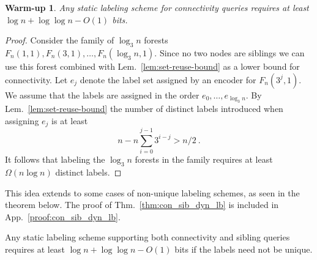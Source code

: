 \documentclass{llncs}
\newtheorem*{warmup}{Warm-up}
\begin{document}
\begin{warmup}
    Any static labeling scheme for connectivity queries requires at least $\log
    n + \log\log n - O(1)$ bits.
\end{warmup}
\begin{proof}
    Consider the family of $\log_3 n$ forests $F_n(1,1), F_n(3,1), \ldots,
    F_n(\log_3 n, 1)$. Since no two nodes are siblings we can use this forest
    combined with Lem.~\ref{lem:set-reuse-bound} as a lower bound for
    connectivity. Let $e_j$ denote the label set assigned by an encoder for
    $F_n(3^j,1)$. We assume that the labels are assigned in the order
    $e_0,\ldots,e_{\log_3 n}$. By Lem.~\ref{lem:set-reuse-bound} the number of
    distinct labels introduced when assigning $e_j$ is at least
    \[
        n - n\sum_{i=0}^{j-1} 3^{i-j} > n/2\ .
    \]
    It follows that labeling the $\log_3 n$ forests in the family requires at
    least $\Omega(n\log n)$ distinct labels.
\end{proof}


This idea extends to some cases of non-unique labeling schemes, as seen in
the theorem below. The proof  of Thm.~\ref{thm:con_sib_dyn_lb} is included in App.~\ref{proof:con_sib_dyn_lb}.

\begin{theorem}\label{thm:con_sib_dyn_lb}
    Any static labeling scheme supporting both connectivity and sibling queries
    requires at least $\log n + \log\log n - O(1)$ bits if the labels need not
    be unique.
\end{theorem}
\end{document}

